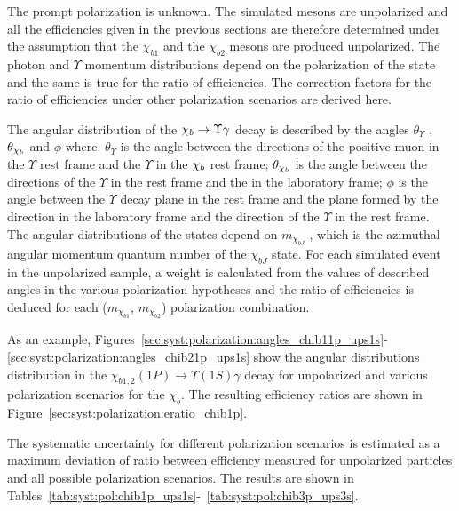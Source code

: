 The prompt \chib polarization is unknown. The simulated \chib mesons are
unpolarized and all the efficiencies given in the previous sections are
therefore determined under the assumption that the $\chi_{b1}$ and the
$\chi_{b2}$ mesons are produced unpolarized. The photon and $\Upsilon$ momentum
distributions depend on the polarization of the \chib state and the same is
true for the ratio of efficiencies. The correction factors for the ratio of
efficiencies under other polarization scenarios are derived here.

The angular distribution of the $\chi_{b} \rightarrow \Upsilon \gamma$ decay is described
by the angles $\theta_{\Upsilon}$ , $\theta_{\chi_{b}}$ and $\phi$ where:
$\theta_{\Upsilon}$ is the angle between the directions of the positive muon in
the $\Upsilon$ rest frame and the $\Upsilon$ in the $\chi_{b}$ rest frame;
$\theta_{\chi_{b}}$ is the angle between the directions of the $\Upsilon$ in the
\chib rest frame and the \chib in the laboratory frame; $\phi$ is the angle
between the $\Upsilon$ decay plane in the \chib rest frame and the plane formed
by the \chib direction in the laboratory frame and the direction of the
$\Upsilon$ in the \chib rest frame. The angular distributions of the
\chib states depend on $m_{\chi_{bJ}}$ , which is the azimuthal angular
momentum quantum number of the $\chi_{bJ}$ state. For each simulated event in
the unpolarized sample, a weight is calculated from the values of described
angles in the various polarization hypotheses and the ratio of efficiencies is
deduced for each ($m_{\chi_{b1}}$, $m_{\chi_{b2}}$) polarization combination.

As an example,
Figures~\ref{sec:syst:polarization:angles_chib11p_ups1s}-\ref{sec:syst:polarization:angles_chib21p_ups1s}
show the angular distributions distribution in the $\chi_{b1,2}(1P) \to
\Upsilon(1S) \gamma$ decay for unpolarized and various polarization scenarios
for the $\chi_b$. The resulting efficiency ratios are shown in
Figure~\ref{sec:syst:polarization:eratio_chib1p}.





The systematic uncertainty for different polarization scenarios is estimated
as a maximum deviation of ratio between efficiency measured for unpolarized
particles and all possible polarization scenarios. The results  are
shown in Tables~\ref{tab:syst:pol:chib1p_ups1s}-~\ref{tab:syst:pol:chib3p_ups3s}.



